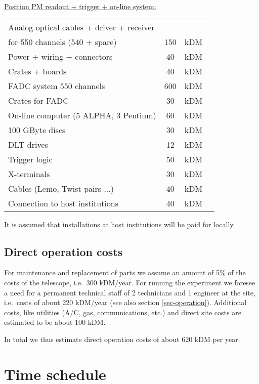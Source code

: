 \newpage
\vspace{1cm}
\noindent
\underline{Position PM readout + trigger + on-line system:}\\
\smallskip 
\begin{tabular}{lccl}
Analog optical cables + driver + receiver & & &  \\ 
for 550 channels (540 + spare) & 150  & kDM & \\ 
Power + wiring + connectors & 40  & kDM & \\ 
Crates + boards & 40  & kDM & \\ 
FADC system 550 channels & 600  & kDM & \\ 
Crates for FADC & 30  & kDM & \\ 
On-line computer (5 ALPHA, 3 Pentium) & 60  & kDM & \\ 
100 GByte discs & 30  & kDM & \\ 
DLT drives & 12  & kDM & \\ 
Trigger logic & 50  & kDM & \\ 
X-terminals & 30  & kDM & \\ 
Cables (Lemo, Twist pairs ...) & 40  & kDM & \\ 
Connection to host institutions & 40  & kDM &
\end{tabular}

It is assumed that installations at host institutions will be paid for
locally.

\section{Direct operation costs}


For maintenance and replacement of parts we assume
an amount of 5\% of the costs of the telescope, i.e.\, 300 kDM/year.
For running the experiment we foresee a need for a permanent technical staff
of 2 technicians and 1 engineer at the site, i.e.\, costs of about 220 kDM/year
(see also section \ref{sec-operation}).
Additional costs, like utilities (A/C, gas, communications, etc.)
and direct site costs are estimated to be about
100 kDM.

In total we thus estimate direct operation costs of about 620 kDM per year.


\cleardoublepage


\chapter{Time schedule}

